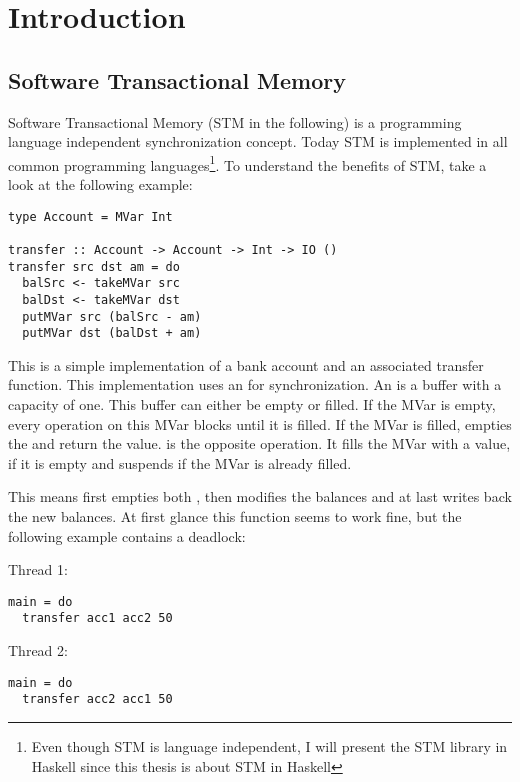 
\chapter{Introduction} 

\label{Chapter1} 

\section{Software Transactional Memory}
\label{STMInterface}
Software Transactional Memory (STM in the following) is a programming language independent synchronization concept. Today STM is implemented 
in all common programming languages\footnote{Even though STM is language independent, I will present the STM library in Haskell since this thesis is
about STM in Haskell}. To understand the benefits of STM, take a look at the following example:
\begin{lstlisting}
type Account = MVar Int

transfer :: Account -> Account -> Int -> IO ()
transfer src dst am = do
  balSrc <- takeMVar src
  balDst <- takeMVar dst
  putMVar src (balSrc - am)
  putMVar dst (balDst + am)
\end{lstlisting}
This is a simple implementation of a bank account and an associated transfer function. This implementation uses an 
for synchronization. An  is a buffer with a capacity of one. This buffer can either be empty or filled. If the MVar is empty,
every  operation on this MVar blocks until it is filled. If the MVar is filled,  empties the 
 and return the value.  is the opposite operation. It fills the MVar with a value, if it is empty and 
suspends if the MVar is already filled.

This means  first empties both , then modifies the balances and at last writes back the new balances.
At first glance this function seems to work fine, but the following example contains a deadlock:
\par\noindent
\begin{minipage}[t]{.45\textwidth}
Thread 1:
\begin{lstlisting}[frame=lrtb]
main = do
  transfer acc1 acc2 50
\end{lstlisting}
\end{minipage}
\hfill
\begin{minipage}[t]{.45\textwidth}
Thread 2:
\begin{lstlisting}[frame=lrtb]
main = do
  transfer acc2 acc1 50
\end{lstlisting}
\end{minipage}

